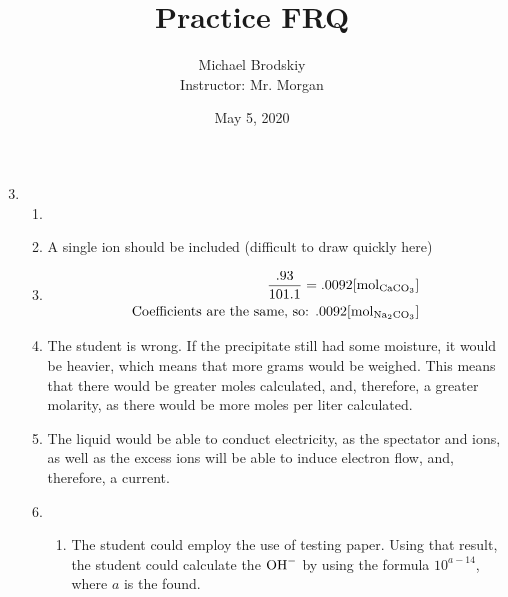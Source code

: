 \documentclass[12pt]{article}
\title{Practice FRQ}
\date{May 5, 2020}
\author{Michael Brodskiy\\ \small Instructor: Mr. Morgan}
\begin{document}
\maketitle

\begin{enumerate}

    \setcounter{enumi}{2}

  \item
    
    \begin{enumerate}

      \item {}

      \item A single  ion should be included (difficult to draw quickly here)

      \item 

        \begin{equation}
          \begin{split}
            \frac{.93}{101.1}=.0092[\si{\mole}_{\ce{CaCO3}}]\\
            \text{Coefficients are the same, so: }.0092[\si{\mole}_{\ce{Na2CO3}}]
          \end{split}
          \label{1}
        \end{equation}

      \item The student is wrong. If the precipitate still had some moisture, it would be heavier, which means that more grams would be weighed. This means that there would be greater moles calculated, and, therefore, a greater molarity, as there would be more moles per liter calculated.

      \item The liquid would be able to conduct electricity, as the spectator  and  ions, as well as the excess  ions will be able to induce electron flow, and, therefore, a current.

      \item 

        \begin{enumerate}

          \item The student could employ the use of  testing paper. Using that result, the student could calculate the $\ce{OH-}$ by using the formula $10^{a-14}$, where $a$ is the  found.


\end{enumerate}
\end{enumerate}
\end{enumerate}
\end{document}
